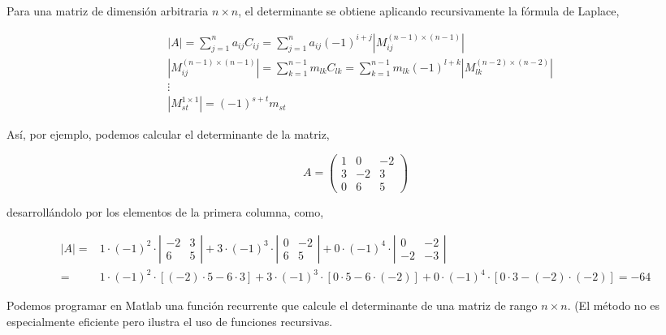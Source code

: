 \begin{paracol}{2}
Para una matriz de dimensión arbitraria $n\times n$, el determinante se obtiene aplicando recursivamente la fórmula de Laplace,
\end{paracol}

\begin{align*}
&\vert A  \vert = \sum_{j=1}^na_{ij}C_{ij} =\sum_{j=1}^na_{ij}(-1)^{i+j} \left \vert M_{ij}^{(n-1)\times(n-1)} \right \vert \\
&\left \vert M_{ij}^{(n-1)\times(n-1)} \right \vert = \sum_{k=1}^{n-1}m_{lk}C_{lk} =\sum_{k=1}^{n-1}m_{lk}(-1)^{l+k} \left \vert M_{lk}^{(n-2)\times (n-2)} \right \vert\\
&\vdots \\
&\left \vert M_{st}^{1\times 1}\right \vert=(-1)^{s+t}m_{st} 
\end{align*}
\begin{paracol}{2}
Así, por ejemplo, podemos calcular el determinante de la matriz,
\end{paracol}
\begin{equation*}
A=\begin{pmatrix}
1& 0& -2\\
3& -2& 3\\
0& 6& 5
\end{pmatrix}
\end{equation*}
\begin{paracol}{2}
desarrollándolo por los elementos de la primera columna, como,
\end{paracol}
\begin{align*}
\left\vert A \right\vert =& 1\cdot (-1)^2\cdot 
\left\vert \begin{matrix}
-2& 3\\ 
6& 5
\end{matrix} \right\vert + 3\cdot (-1)^3\cdot
\left\vert \begin{matrix}
0& -2\\ 
6& 5
\end{matrix} \right\vert+ 0\cdot (-1)^4 \cdot 
\left\vert \begin{matrix}
0& -2\\ 
-2& -3
\end{matrix} \right\vert \\
=& 1\cdot (-1)^2\cdot \left[ (-2)\cdot 5 - 6\cdot 3 \right] +3\cdot (-1)^3\cdot  \left[ 0\cdot 5 - 6\cdot (-2)\right] + 0\cdot (-1)^4 \cdot \left[ 0\cdot 3 - (-2)\cdot (-2)\right]= -64
\end{align*}

Podemos programar en Matlab una función recurrente que calcule el determinante de una matriz de rango $n\times n$. (El método no es especialmente eficiente pero ilustra el uso de funciones recursivas.

